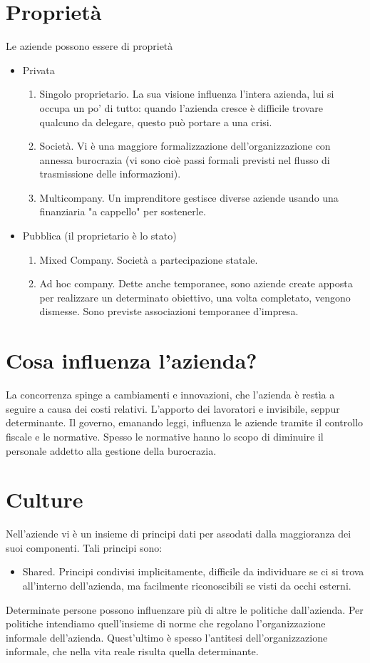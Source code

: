 \section{Propriet\`a}
Le aziende possono essere di propriet\`a
\begin{itemize}
\item Privata
\begin{enumerate}
\item Singolo proprietario. La sua visione influenza l'intera azienda, lui si occupa un po' di tutto: quando l'azienda cresce \`e difficile trovare qualcuno da delegare, questo pu\`o portare a una crisi.
\item Societ\`a. Vi \`e una maggiore formalizzazione dell'organizzazione con annessa burocrazia (vi sono cio\`e passi formali previsti nel flusso di trasmissione delle informazioni).
\item Multicompany. Un imprenditore gestisce diverse aziende usando una finanziaria "a cappello" per sostenerle.
\end{enumerate}
\item Pubblica (il proprietario \`e lo stato)
\begin{enumerate}
\item Mixed Company. Societ\`a a partecipazione statale.
\item Ad hoc company. Dette anche temporanee, sono aziende create apposta per realizzare un determinato obiettivo, una volta completato, vengono dismesse. Sono previste associazioni temporanee d'impresa.
\end{enumerate}
\end{itemize}

\section{Cosa influenza l'azienda?}
La concorrenza spinge a cambiamenti e innovazioni, che l'azienda \`e rest\`ia a seguire a causa dei costi relativi.
L'apporto dei lavoratori e invisibile, seppur determinante.
Il governo, emanando leggi, influenza le aziende tramite il controllo fiscale e le normative. Spesso le normative hanno lo scopo di diminuire il personale addetto alla gestione della burocrazia.
\section{Culture}
Nell'aziende vi \`e un insieme di principi dati per assodati dalla maggioranza dei suoi componenti. Tali principi sono:
\begin{itemize}
\item Shared. Principi condivisi implicitamente, difficile da individuare se ci si trova all'interno dell'azienda, ma facilmente riconoscibili se visti da occhi esterni.

\end{itemize}
Determinate persone possono influenzare pi\`u di altre le politiche dall'azienda.
Per politiche intendiamo quell'insieme di norme che regolano l'organizzazione informale dell'azienda. Quest'ultimo \`e spesso l'antitesi dell'organizzazione informale, che nella vita reale risulta quella determinante.

